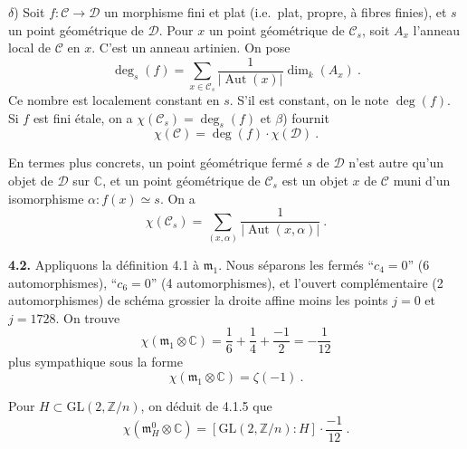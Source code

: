 \documentclass[10pt,a4paper]{amsart}
\theoremstyle{plain}
\theoremstyle{definition}
\DeclareMathOperator{\Aut}{Aut}
\renewcommand{\deg}{\operatorname{deg}}
\newcommand{\m}{\mathfrak{m}}
\newcommand{\cC}{\mathcal{C}}
\newcommand{\ZZ}{\mathbb{Z}}
\newcommand{\CC}{\mathbb{C}}
\newcommand{\cD}{\mathcal{D}}
\newcommand{\GL}{\mathrm{GL}}
\begin{document}
$\delta$) Soit $f : \cC \to \cD$ un morphisme fini et plat (i.e.\ plat, propre, \`a fibres finies), et $s$ un point g\'eom\'etrique de $\cD$. Pour $x$ un point g\'eom\'etrique de $\cC_s$, soit $A_x$ l'anneau local de $\cC$ en $x$. C'est un anneau artinien. On pose
\begin{equation}
\deg_s(f) = \sum_{x \in \cC_s} \frac{1}{|\Aut(x)|} \dim_k(A_x)\ .
\end{equation}
Ce nombre est localement constant en $s$. S'il est constant, on le note $\deg(f)$. Si $f$ est fini \'etale, on a $\chi(\cC_s) = \deg_s(f)$ et $\beta$) fournit
\begin{equation}
\chi(\cC) = \deg(f) \cdot \chi(\cD)\ .
\end{equation}

En termes plus concrets, un point g\'eom\'etrique ferm\'e $s$ de $\cD$ n'est autre qu'un objet de $\cD$ sur $\CC$, et un point g\'eom\'etrique de $\cC_s$ est un objet $x$ de $\cC$ muni d'un isomorphisme $\alpha : f(x) \simeq s$. On a
\begin{equation}
\chi(\cC_s) = \sum_{(x,\alpha)} \frac{1}{|\Aut(x,\alpha)|}\ .
\end{equation}

\medskip\noindent\textbf{4.2.} Appliquons la d\'efinition 4.1 \`a $\m_1$. Nous s\'eparons les ferm\'es ``$c_4 = 0$'' (6 automorphismes), ``$c_6 = 0$'' (4 automorphismes), et l'ouvert compl\'ementaire (2 automorphismes) de sch\'ema grossier la droite affine moins les points $j = 0$ et $j = 1728$. On trouve
\begin{equation}
\chi(\m_1 \otimes \CC) = \frac{1}{6} + \frac{1}{4} + \frac{-1}{2} = -\frac{1}{12}
\end{equation}
plus sympathique sous la forme
\begin{equation}
\chi(\m_1 \otimes \CC) = \zeta(-1)\ .
\end{equation}

Pour $H \subset \GL(2,\ZZ/n)$, on d\'eduit de 4.1.5 que
\begin{equation}
\chi(\m_H^0 \otimes \CC) = [\GL(2,\ZZ/n) : H] \cdot \frac{-1}{12}\ .
\end{equation}
\end{document}
